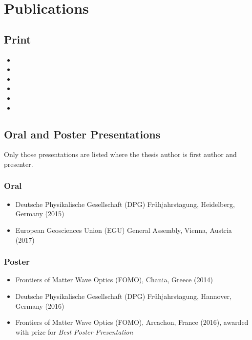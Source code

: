\chapter*{Publications}\label{app:publications}

\begin{refsection}
	
	\section*{Print}
	\begin{itemize}
		\item {}
		\item {}
		\item {} 
		\item {}
		\item {}
		\item {} 
	\end{itemize}
	
	\section*{Oral and Poster Presentations}
	Only those presentations are listed where the thesis author is first  author and presenter.
	\subsection*{Oral}
	\begin{itemize}
		\item Deutsche Physikalische Gesellschaft (DPG) Frühjahrstagung, Heidelberg, Germany (2015)
		\item European Geosciences Union (EGU) General Assembly, Vienna, Austria (2017)
	\end{itemize}
	\subsection*{Poster}
	\begin{itemize}
		\item Frontiers of Matter Wave Optics (FOMO), Chania, Greece (2014)
		\item Deutsche Physikalische Gesellschaft (DPG) Frühjahrstagung, Hannover, Germany (2016)
		\item Frontiers of Matter Wave Optics (FOMO), Arcachon, France (2016), awarded with prize for \emph{Best Poster Presentation} 
	\end{itemize}
	
\end{refsection}
